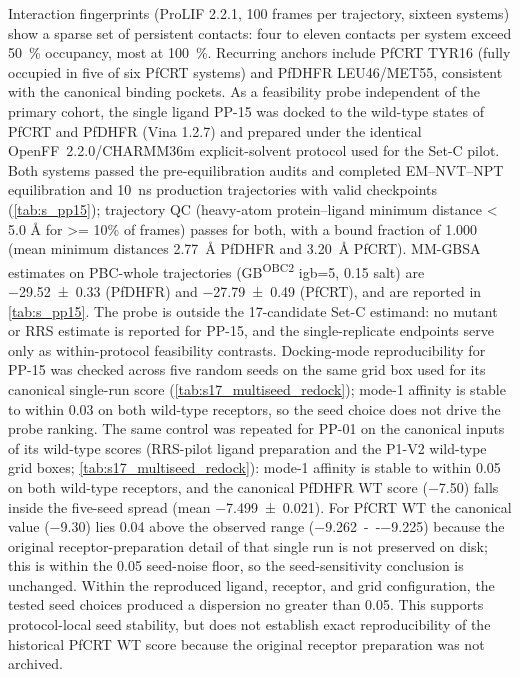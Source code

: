 \documentclass[journal=jcisd8,manuscript=suppinfo,layout=traditional]{achemso}
\begin{document}
Interaction fingerprints (ProLIF 2.2.1, \num{100} frames per trajectory, sixteen systems) show a sparse set of persistent contacts: four to eleven contacts per system exceed \qty{50}{\percent} occupancy, most at \qty{100}{\percent}. Recurring anchors include PfCRT TYR16 (fully occupied in five of six PfCRT systems) and PfDHFR LEU46/MET55, consistent with the canonical binding pockets. As a feasibility probe independent of the primary cohort, the single ligand PP-15 was docked to the wild-type states of PfCRT and PfDHFR (Vina 1.2.7) and prepared under the identical OpenFF~2.2.0/CHARMM36m explicit-solvent protocol used for the Set-C pilot. Both systems passed the pre-equilibration audits and completed EM--NVT--NPT equilibration and \qty{10}{ns} production trajectories with valid checkpoints (\cref{tab:s_pp15}); trajectory QC (heavy-atom protein--ligand minimum distance \num{< 5.0} \si{\angstrom} for \num{>= 10}\% of frames) passes for both, with a bound fraction of \num{1.000} (mean minimum distances \qty{2.77}{\angstrom} PfDHFR and \qty{3.20}{\angstrom} PfCRT). MM-GBSA estimates on PBC-whole trajectories (GB\textsuperscript{OBC2} igb=5, \qty{0.15}{\molar} salt) are \qty{-29.52 \pm 0.33}{\kcalmol} (PfDHFR) and \qty{-27.79 \pm 0.49}{\kcalmol} (PfCRT), and are reported in \cref{tab:s_pp15}. The probe is outside the 17-candidate Set-C estimand: no mutant or RRS estimate is reported for PP-15, and the single-replicate endpoints serve only as within-protocol feasibility contrasts. Docking-mode reproducibility for PP-15 was checked across five random seeds on the same grid box used for its canonical single-run score (\cref{tab:s17_multiseed_redock}); mode-1 affinity is stable to within \qty{0.03}{\kcalmol} on both wild-type receptors, so the seed choice does not drive the probe ranking. The same control was repeated for PP-01 on the canonical inputs of its wild-type scores (RRS-pilot ligand preparation and the P1-V2 wild-type grid boxes; \cref{tab:s17_multiseed_redock}): mode-1 affinity is stable to within \qty{0.05}{\kcalmol} on both wild-type receptors, and the canonical PfDHFR WT score (\qty{-7.50}{\kcalmol}) falls inside the five-seed spread (mean \qty{-7.499 \pm 0.021}{\kcalmol}). For PfCRT WT the canonical value (\qty{-9.30}{\kcalmol}) lies \qty{0.04}{\kcalmol} above the observed range (\qty{-9.262}{--}\qty{-9.225}{\kcalmol}) because the original receptor-preparation detail of that single run is not preserved on disk; this is within the \qty{0.05}{\kcalmol} seed-noise floor, so the seed-sensitivity conclusion is unchanged. Within the reproduced ligand, receptor, and grid configuration, the tested seed choices produced a dispersion no greater than \qty{0.05}{\kcalmol}. This supports protocol-local seed stability, but does not establish exact reproducibility of the historical PfCRT WT score because the original receptor preparation was not archived.
\end{document}
